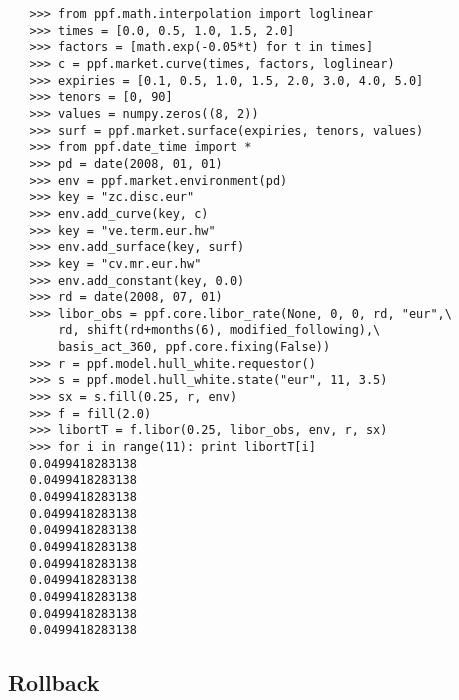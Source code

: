 \begin{verbatim} 
   >>> from ppf.math.interpolation import loglinear
   >>> times = [0.0, 0.5, 1.0, 1.5, 2.0]
   >>> factors = [math.exp(-0.05*t) for t in times]
   >>> c = ppf.market.curve(times, factors, loglinear)
   >>> expiries = [0.1, 0.5, 1.0, 1.5, 2.0, 3.0, 4.0, 5.0]
   >>> tenors = [0, 90]
   >>> values = numpy.zeros((8, 2))
   >>> surf = ppf.market.surface(expiries, tenors, values)
   >>> from ppf.date_time import *
   >>> pd = date(2008, 01, 01)
   >>> env = ppf.market.environment(pd)
   >>> key = "zc.disc.eur"
   >>> env.add_curve(key, c)
   >>> key = "ve.term.eur.hw"
   >>> env.add_surface(key, surf)
   >>> key = "cv.mr.eur.hw"
   >>> env.add_constant(key, 0.0)
   >>> rd = date(2008, 07, 01)
   >>> libor_obs = ppf.core.libor_rate(None, 0, 0, rd, "eur",\
       rd, shift(rd+months(6), modified_following),\
       basis_act_360, ppf.core.fixing(False))
   >>> r = ppf.model.hull_white.requestor()
   >>> s = ppf.model.hull_white.state("eur", 11, 3.5)
   >>> sx = s.fill(0.25, r, env)
   >>> f = fill(2.0)
   >>> libortT = f.libor(0.25, libor_obs, env, r, sx)
   >>> for i in range(11): print libortT[i]
   0.0499418283138
   0.0499418283138
   0.0499418283138
   0.0499418283138
   0.0499418283138
   0.0499418283138
   0.0499418283138
   0.0499418283138
   0.0499418283138
   0.0499418283138
   0.0499418283138
\end{verbatim}

\subsection{Rollback} 

